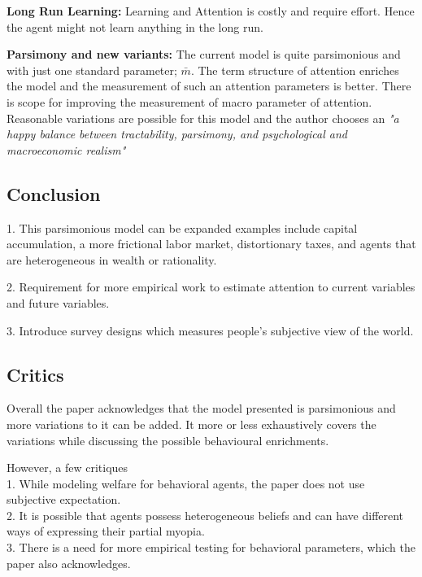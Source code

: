 \documentclass{beamer}
\begin{document}
\begin{frame}{\subsecname}
\textbf{Long Run Learning:} Learning and Attention is costly and require effort. Hence the agent might not learn anything in the long run. 

\textbf{Parsimony and new variants:} The current model is quite parsimonious and with just one standard parameter; $\bar{m}$. The term structure of attention enriches the model and the measurement of such an attention parameters is better. There is scope for improving the measurement of macro parameter of attention. Reasonable variations are possible for this model and the author chooses an \textit{"a happy balance between tractability, parsimony, and psychological and macroeconomic realism"}
\end{frame}

\subsection{Conclusion}
\begin{frame}{\subsecname}

1. This parsimonious model can be expanded examples include capital accumulation, a more frictional labor market, distortionary taxes, and agents that are heterogeneous in wealth or rationality.

2. Requirement for more empirical work to estimate attention to current variables and future variables.

3. Introduce survey designs which measures people's subjective view of the world. 

\end{frame}

\subsection{Critics}
\begin{frame}{\subsecname}

Overall the paper acknowledges that the model presented is parsimonious and more variations to it can be added. It more or less exhaustively covers the variations while discussing the possible behavioural enrichments. 

However, a few critiques \\
1. While modeling welfare for behavioral agents, the paper does not use subjective expectation. \\
2. It is possible that agents possess heterogeneous beliefs and can have different ways of expressing their partial myopia. \\
3. There is a need for more empirical testing for behavioral parameters, which the paper also acknowledges.


\end{frame}
\end{document}
